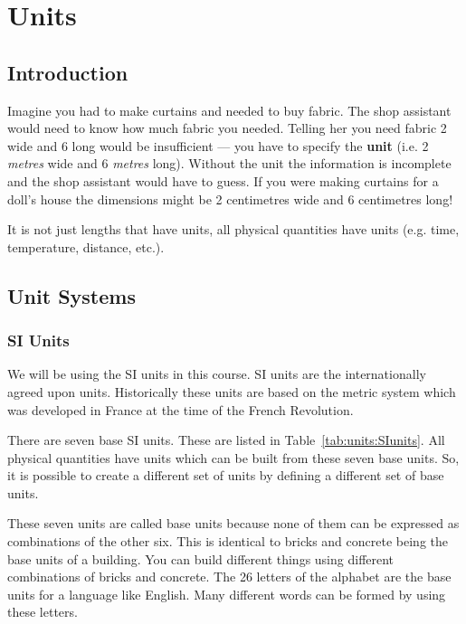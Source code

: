 \chapter{Units}
\label{pd}

\section{Introduction}
Imagine you had to make curtains and needed to buy fabric. The
shop assistant would need to know how much fabric you needed.
Telling her you need fabric 2 wide and 6 long would be
insufficient --- you have to specify the {\bf unit} (i.e. 2 {\it
metres} wide and 6 {\it metres} long). Without the unit the
information is incomplete and the shop assistant would have to
guess. If you were making curtains for a doll's house the
dimensions might be 2 centimetres wide and 6 centimetres long!

It is not just lengths that have units, all physical quantities
have units (e.g. time, temperature, distance, etc.).


\section{Unit Systems}
\subsection{SI Units}
We will be using the SI units in this course. SI units are the
internationally agreed upon units. Historically these units are
based on the metric system which was developed in France at the
time of the French Revolution.


There are seven base SI units. These are listed in
Table~\ref{tab:units:SIunits}. All physical quantities have units
which can be built from these seven base units. So, it is possible to create a
different set of units by defining a different set of base units.

These seven units are called base units because none of them can
be expressed as combinations of the other six. This is identical
to bricks and concrete being the base units of a building. You can
build different things using different combinations of bricks and
concrete. The 26 letters of the alphabet are the base units for a
language like English. Many different words can be formed by using
these letters.

